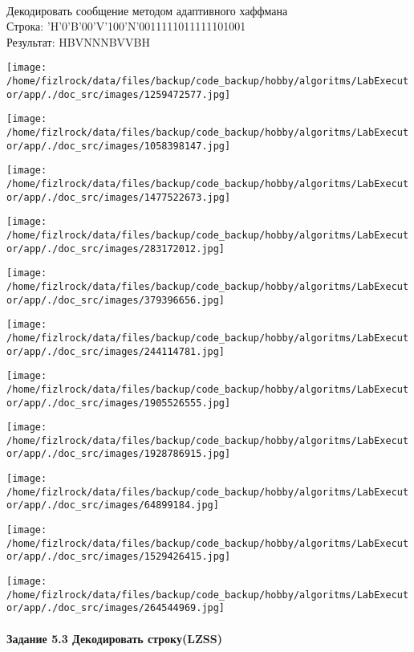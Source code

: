 \documentclass[a4paper, 12pt]{article}
\begin{document}
\\ 

Декодировать сообщение методом адаптивного хаффмана \\
Строка: 
'H'0'B'00'V'100'N'0011111011111101001\\
Результат: HBVNNNBVVBH

\texttt{[image: /home/fizlrock/data/files/backup/code\_backup/hobby/algoritms/LabExecutor/app/./doc\_src/images/1259472577.jpg]}

\texttt{[image: /home/fizlrock/data/files/backup/code\_backup/hobby/algoritms/LabExecutor/app/./doc\_src/images/1058398147.jpg]}

\texttt{[image: /home/fizlrock/data/files/backup/code\_backup/hobby/algoritms/LabExecutor/app/./doc\_src/images/1477522673.jpg]}

\texttt{[image: /home/fizlrock/data/files/backup/code\_backup/hobby/algoritms/LabExecutor/app/./doc\_src/images/283172012.jpg]}

\texttt{[image: /home/fizlrock/data/files/backup/code\_backup/hobby/algoritms/LabExecutor/app/./doc\_src/images/379396656.jpg]}

\texttt{[image: /home/fizlrock/data/files/backup/code\_backup/hobby/algoritms/LabExecutor/app/./doc\_src/images/244114781.jpg]}

\texttt{[image: /home/fizlrock/data/files/backup/code\_backup/hobby/algoritms/LabExecutor/app/./doc\_src/images/1905526555.jpg]}

\texttt{[image: /home/fizlrock/data/files/backup/code\_backup/hobby/algoritms/LabExecutor/app/./doc\_src/images/1928786915.jpg]}

\texttt{[image: /home/fizlrock/data/files/backup/code\_backup/hobby/algoritms/LabExecutor/app/./doc\_src/images/64899184.jpg]}

\texttt{[image: /home/fizlrock/data/files/backup/code\_backup/hobby/algoritms/LabExecutor/app/./doc\_src/images/1529426415.jpg]}

\texttt{[image: /home/fizlrock/data/files/backup/code\_backup/hobby/algoritms/LabExecutor/app/./doc\_src/images/264544969.jpg]}
\pagebreak
\paragraph{Задание 5.3 Декодировать строку(LZSS)\\}
\end{document}
